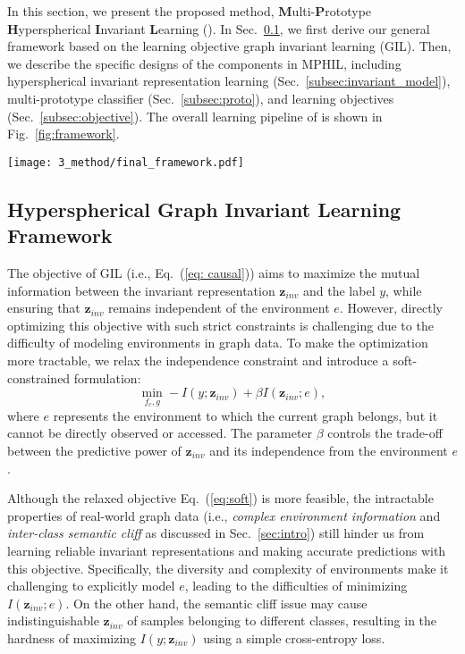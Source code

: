 In this section, we present the proposed method, \textbf{M}ulti-\textbf{P}rototype \textbf{H}yperspherical \textbf{I}nvariant \textbf{L}earning (\ourmethod). In Sec.~\ref{subsec:framework}, we first derive our general framework based on the learning objective graph invariant learning (GIL). Then, we describe the specific designs of the components in MPHIL, including hyperspherical invariant representation learning (Sec.~\ref{subsec:invariant_model}), multi-prototype classifier (Sec.~\ref{subsec:proto}), and learning objectives (Sec.~\ref{subsec:objective}). The overall learning pipeline of \ourmethod is shown in Fig.~\ref{fig:framework}.
\begin{figure*}[t!] 
\centering    
\texttt{[image: 3\_method/final\_framework.pdf]}
\caption{The overall framework of \ourmethod. First, a GNN-based model generates the invariant representation and maps it into the hyperspherical space. Then, the classifier makes the prediction based on multiple prototypes. The overall method is trained by a three-term joint objective.}
\label{fig:framework} 
\end{figure*}
\subsection{Hyperspherical Graph Invariant Learning Framework} \label{subsec:framework}
The objective of GIL (i.e., Eq.~(\ref{eq: causal})) aims to maximize the mutual information between the invariant representation $\mathbf{z}_{inv}$ and the label $y$, while ensuring that $\mathbf{z}_{inv}$ remains independent of the environment $e$. However, directly optimizing this objective with such strict constraints is challenging due to the difficulty of modeling environments in graph data. To make the optimization more tractable, we relax the independence constraint and introduce a soft-constrained formulation:
\begin{equation}
\label{eq:soft}
   \underset{f_{c}, g}{\min} -I(y; \mathbf{z}_{inv})+\beta I(\mathbf{z}_{inv};e),
\end{equation}
where $e$ represents the environment to which the current graph belongs, but it cannot be directly observed or accessed. The parameter $\beta$ controls the trade-off between the predictive power of $\mathbf{z}_{inv}$ and its independence from the environment $e$. 

Although the relaxed objective Eq.~(\ref{eq:soft}) is more feasible, the intractable properties of real-world graph data (i.e., \textit{complex environment information} and \textit{inter-class semantic cliff} as discussed in Sec.~\ref{sec:intro}) still hinder us from learning reliable invariant representations and making accurate predictions with this objective. Specifically, the diversity and complexity of environments make it challenging to explicitly model $e$, leading to the difficulties of minimizing $I(\mathbf{z}_{inv};e)$. On the other hand, the semantic cliff issue may cause indistinguishable $\mathbf{z}_{inv}$ of samples belonging to different classes, resulting in the hardness of maximizing $I(y; \mathbf{z}_{inv})$ using a simple cross-entropy loss. 

